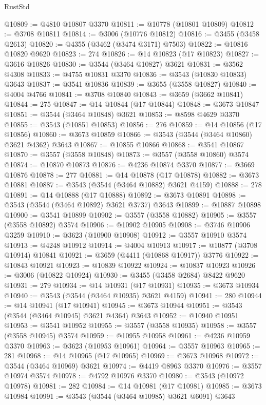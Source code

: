 \begin{lexlean}{RustStd}
\begin{coremodule}
@10809 := @4810 @10807 @3370
@10811 := @10778 (@10801 @10809)
@10812 := @3708 @10811
@10814 := @3006 (@10776 @10812)
@10816 := @3455 (@3458 @2613)
@10820 := @4355 (@3462 (@3474 @3171) @7503)
@10822 := @10816 @10820 @9620
@10823 := 274
@10826 := @14 @10823 (@17 @10823)
@10827 := @3616 @10826
@10830 := @3544 (@3464 @10827) @3621
@10831 := @3562 @4308
@10833 := @4755 @10831 @3370
@10836 := @3543 (@10830 @10833) @3643
@10837 := @3541 @10836
@10839 := @3655 (@3558 @10827)
@10840 := @4004 @4766
@10841 := @3708 @10840
@10843 := @3659 (@3662 @10841)
@10844 := 275
@10847 := @14 @10844 (@17 @10844)
@10848 := @3673 @10847
@10851 := @3544 (@3464 @10848) @3621
@10853 := @8598 @4629 @3370
@10855 := @3543 (@10851 @10853)
@10856 := 276
@10859 := @14 @10856 (@17 @10856)
@10860 := @3673 @10859
@10866 := @3543 (@3544 (@3464 @10860) @3621 @4362) @3643
@10867 := @10855 @10866
@10868 := @3541 @10867
@10870 := @3557 (@3558 @10848)
@10873 := @3557 (@3558 @10860) @3574
@10874 := @10870 @10873
@10876 := @4236 @10874 @3370
@10877 := @3669 @10876
@10878 := 277
@10881 := @14 @10878 (@17 @10878)
@10882 := @3673 @10881
@10887 := @3543 (@3544 (@3464 @10882) @3621 @4159)
@10888 := 278
@10891 := @14 @10888 (@17 @10888)
@10892 := @3673 @10891
@10898 := @3543 (@3544 (@3464 @10892) @3621 @3737) @3643
@10899 := @10887 @10898
@10900 := @3541 @10899
@10902 := @3557 (@3558 @10882)
@10905 := @3557 (@3558 @10892) @3574
@10906 := @10902 @10905
@10908 := @3746 @10906 @3259
@10910 := @3623 (@10900 @10908)
@10912 := @3557 @10910 @3574
@10913 := @4248 @10912
@10914 := @4004 @10913
@10917 := @10877 (@3708 @10914) @10841
@10921 := @3659 (@4411 (@10868 @10917)) @3776
@10922 := @10843 @10921
@10923 := @10839 @10922
@10924 := @10837 @10923
@10926 := @3006 (@10822 @10924)
@10930 := @3455 (@3458 @2684) @8422 @9620
@10931 := 279
@10934 := @14 @10931 (@17 @10931)
@10935 := @3673 @10934
@10940 := @3543 (@3544 (@3464 @10935) @3621 @4159)
@10941 := 280
@10944 := @14 @10941 (@17 @10941)
@10945 := @3673 @10944
@10951 := @3543 (@3544 (@3464 @10945) @3621 @4364) @3643
@10952 := @10940 @10951
@10953 := @3541 @10952
@10955 := @3557 (@3558 @10935)
@10958 := @3557 (@3558 @10945) @3574
@10959 := @10955 @10958
@10961 := @4236 @10959 @3370
@10963 := @3623 (@10953 @10961)
@10964 := @3557 @10963
@10965 := 281
@10968 := @14 @10965 (@17 @10965)
@10969 := @3673 @10968
@10972 := @3544 (@3464 @10969) @3621
@10974 := @4419 @8963 @3370
@10976 := @3557 @10974 @3574
@10978 := @4792 @10976 @3370
@10980 := @3543 (@10972 @10978)
@10981 := 282
@10984 := @14 @10981 (@17 @10981)
@10985 := @3673 @10984
@10991 := @3543 (@3544 (@3464 @10985) @3621 @6091) @3643

\end{coremodule}
\end{lexlean}
